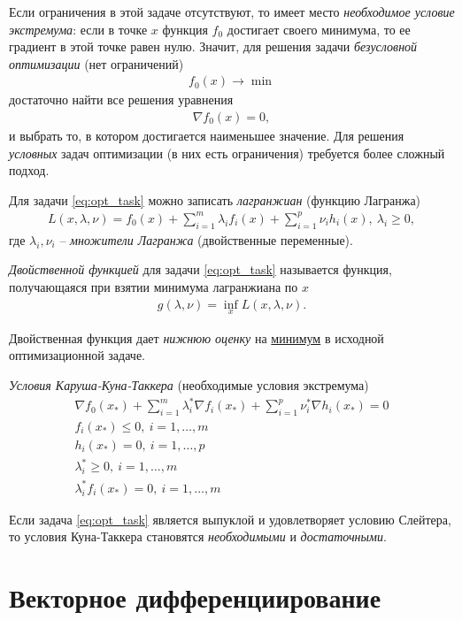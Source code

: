 \documentclass[%
	11pt,
	a4paper,
	utf8,
		]{article}
\begin{document}
Если ограничения в этой задаче отсутствуют, то имеет место \emph{необходимое условие экстремума}: если в точке $ x $ функция $ f_0 $  достигает своего минимума, то ее градиент в этой точке равен нулю. Значит, для решения задачи \emph{безусловной оптимизации} (нет ограничений)
\begin{align*}
	f_0(x) \rightarrow \min
\end{align*}
достаточно найти все решения уравнения
\begin{align*}
	\nabla f_0(x) = 0,
\end{align*}
и выбрать то, в котором достигается наименьшее значение. Для решения \emph{условных} задач оптимизации (в них есть ограничения) требуется более сложный подход.

Для задачи \eqref{eq:opt_task} можно записать \emph{лагранжиан} (функцию Лагранжа)
\begin{align*}
	L(x, \lambda, \nu) = f_0(x) + \sum_{i=1}^{m} \lambda_i f_i(x) + \sum_{i=1}^{p} \nu_i h_i(x), \ \lambda_i \geqslant 0,
\end{align*}
где $ \lambda_i, \nu_i $ -- \emph{множители Лагранжа} (двойственные переменные).

\emph{Двойственной функцией} для задачи \eqref{eq:opt_task} называется функция, получающаяся при взятии минимума лагранжиана по $ x $
\begin{align*}
	g(\lambda, \nu) = \inf_x L(x, \lambda, \nu).
\end{align*}

Двойственная функция дает \emph{нижнюю оценку} на \underline{минимум} в исходной оптимизационной задаче.

\emph{Условия Каруша-Куна-Таккера} (необходимые условия экстремума)
\begin{align*}
	\nabla f_0(x_*) + \sum_{i=1}^{m} \lambda_i^* \nabla f_i(x_*) + \sum_{i=1}^{p} \nu_i^* \nabla h_i (x_*) = 0\\
	f_i(x_*) \leqslant 0, \ i = 1, \ldots, m\\
	h_i(x_*) = 0, \ i = 1, \ldots, p\\
	\lambda_i^* \geqslant 0, \ i = 1, \ldots, m\\
	\lambda_i^* f_i(x_*) = 0, \ i = 1, \ldots, m
\end{align*}

Если задача \eqref{eq:opt_task} является выпуклой и удовлетворяет условию Слейтера, то условия Куна-Таккера становятся \emph{необходимыми} и \emph{достаточными}.


\section{Векторное дифференциирование}
\end{document}

